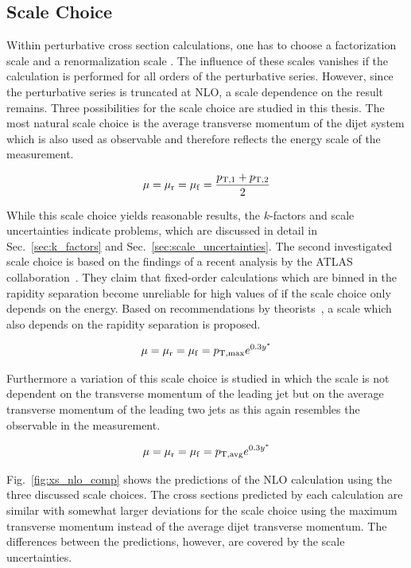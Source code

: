 \subsection{Scale Choice}
\label{sec:scale_coice}

Within perturbative cross section calculations, one has to choose a
factorization scale \muf and a renormalization scale \mur. The influence of
these scales vanishes if the calculation is performed for all orders of the
perturbative series. However, since the perturbative series is truncated at
NLO, a scale dependence on the result remains. Three possibilities for the scale
choice are studied in this thesis.  The most natural scale choice is the average
transverse momentum  of the dijet system which is also used as observable and
therefore reflects the energy scale of the measurement.

\begin{equation*}
    \mu = \mu_{\mathrm{r}} = \mu_{\mathrm{f}} = \frac{p_{\mathrm{T},1} + p_{\mathrm{T},2}}{2}
\end{equation*}

While this scale choice yields reasonable results, the $k$-factors and scale
uncertainties indicate problems, which are discussed in detail in
Sec.~\ref{sec:k_factors} and Sec.~\ref{sec:scale_uncertainties}. The second
investigated scale choice is based on the findings of a recent analysis by the
ATLAS collaboration~\cite{Aad:2011fc}. They claim that fixed-order calculations
which are binned in the rapidity separation \ystar become  unreliable for high
values of \ystar if the scale choice only depends on the energy. Based on
recommendations by theorists~\cite{Ellis:1992en}, a scale which also depends on
the rapidity separation is proposed.

\begin{equation*}
    \mu = \mu_{\mathrm{r}} = \mu_{\mathrm{f}} = p_{\mathrm{T,max}} e^{0.3 y^*} 
\end{equation*}

Furthermore a variation of this scale choice is studied in which the scale is not
dependent on the transverse momentum of the leading jet but on the average
transverse momentum of the leading two jets as this again resembles the
observable in the measurement.

\begin{equation*}
    \mu = \mu_{\mathrm{r}} = \mu_{\mathrm{f}} = p_{\mathrm{T,avg}} e^{0.3 y^*} 
\end{equation*}

Fig.~\ref{fig:xs_nlo_comp} shows the predictions of the NLO calculation using
the three discussed scale choices. The cross sections predicted by each
calculation are similar with somewhat larger deviations for the scale choice using the
maximum transverse momentum instead of the average dijet transverse momentum.
The differences between the predictions, however, are covered by the scale
uncertainties.

